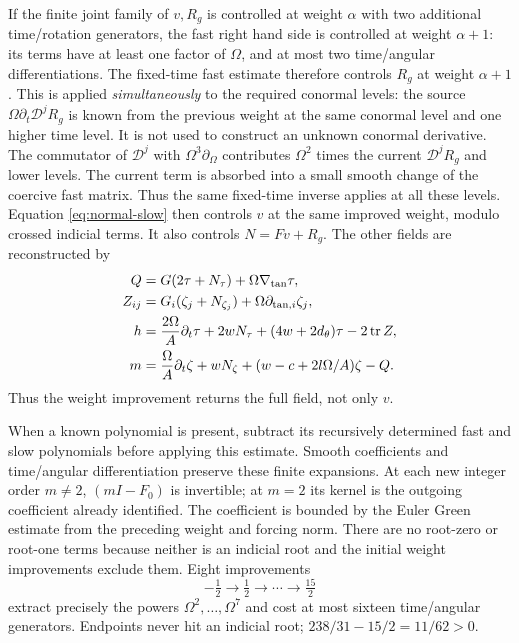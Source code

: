 If the finite joint family of $v,R_g$ is controlled at weight $\alpha$ with
two additional time/rotation generators,
the fast right hand side is controlled at weight $\alpha+1$: its terms have
at least one factor of $\Omega$, and at most two time/angular differentiations.
The fixed-time fast estimate therefore controls $R_g$ at weight
$\alpha+1$.  This is applied \emph{simultaneously} to the required conormal
levels: the source $\Omega\partial_t\mathcal D^jR_g$ is known from the
previous weight at the same conormal level and one higher time level.
It is not used to construct an unknown conormal derivative.
The commutator of $\mathcal D^j$ with $\Omega^3\partial_\Omega$ contributes
$\Omega^2$ times the current $\mathcal D^jR_g$ and lower levels.  The current
term is absorbed into a small smooth change of the coercive fast matrix.
Thus the same fixed-time inverse applies at all these levels.
Equation \eqref{eq:normal-slow} then controls $v$ at the same
improved weight, modulo crossed indicial terms. It also controls $N=Fv+R_g$.
The other fields are reconstructed by
\begin{align}
 Q&=G(2\tau+N_\tau)+\Omega\nabla_{\rm tan}\tau,\\
 Z_{ij}&=G_i(\zeta_j+N_{\zeta_j})
                 +\Omega\partial_{{\rm tan},i}\zeta_j,\\
 h&=\frac{2\Omega}{A}\partial_t\tau+2wN_\tau
                  +(4w+2d_\theta)\tau-2\operatorname{tr}Z,\\
 m&=\frac\Omega A\partial_t\zeta+wN_\zeta
                  +(w-c+2l\Omega/A)\zeta-Q.
\end{align}
Thus the weight improvement returns the full field, not only $v$.

When a known polynomial is present, subtract its recursively determined
fast and slow polynomials before applying this estimate. Smooth coefficients
and time/angular differentiation preserve these finite expansions. At each
new integer order $m\ne2$, $(mI-F_0)$ is invertible; at $m=2$ its kernel is
the outgoing coefficient already identified. The coefficient is bounded by
the Euler Green estimate from the preceding weight and forcing norm.
There are no root-zero or root-one terms because neither is an indicial
root and the initial weight improvements exclude them. Eight improvements
\[
 -\tfrac12\longrightarrow\tfrac12\longrightarrow\cdots
 \longrightarrow\tfrac{15}{2}
\]
extract precisely the powers $\Omega^2,\ldots,\Omega^7$ and cost at most
sixteen time/angular generators. Endpoints never hit an indicial root;
$238/31-15/2=11/62>0$.

